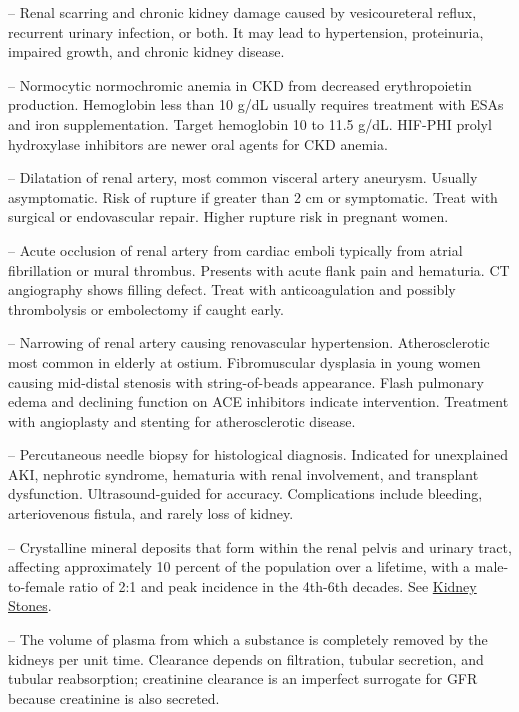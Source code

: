 -- Renal scarring and chronic kidney damage caused by vesicoureteral reflux, recurrent urinary infection, or both. It may lead to hypertension, proteinuria, impaired growth, and chronic kidney disease.

-- Normocytic normochromic anemia in CKD from decreased erythropoietin production. Hemoglobin less than 10 g/dL usually requires treatment with ESAs and iron supplementation. Target hemoglobin 10 to 11.5 g/dL. HIF-PHI prolyl hydroxylase inhibitors are newer oral agents for CKD anemia.

-- Dilatation of renal artery, most common visceral artery aneurysm. Usually asymptomatic. Risk of rupture if greater than 2 cm or symptomatic. Treat with surgical or endovascular repair. Higher rupture risk in pregnant women.

-- Acute occlusion of renal artery from cardiac emboli typically from atrial fibrillation or mural thrombus. Presents with acute flank pain and hematuria. CT angiography shows filling defect. Treat with anticoagulation and possibly thrombolysis or embolectomy if caught early.

-- Narrowing of renal artery causing renovascular hypertension. Atherosclerotic most common in elderly at ostium. Fibromuscular dysplasia in young women causing mid-distal stenosis with string-of-beads appearance. Flash pulmonary edema and declining function on ACE inhibitors indicate intervention. Treatment with angioplasty and stenting for atherosclerotic disease.

-- Percutaneous needle biopsy for histological diagnosis. Indicated for unexplained AKI, nephrotic syndrome, hematuria with renal involvement, and transplant dysfunction. Ultrasound-guided for accuracy. Complications include bleeding, arteriovenous fistula, and rarely loss of kidney.

-- Crystalline mineral deposits that form within the renal pelvis and urinary tract, affecting approximately 10 percent of the population over a lifetime, with a male-to-female ratio of 2:1 and peak incidence in the 4th-6th decades. See \hyperlink{Kidney stones}{Kidney Stones}.

-- The volume of plasma from which a substance is completely removed by the kidneys per unit time. Clearance depends on filtration, tubular secretion, and tubular reabsorption; creatinine clearance is an imperfect surrogate for GFR because creatinine is also secreted.

